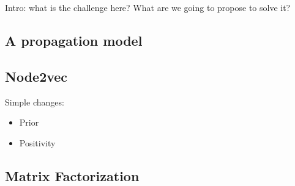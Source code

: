 Intro: what is the challenge here? What are we going to propose to solve it?

\subsection{A propagation model}

\subsection{Node2vec}

Simple changes:

\begin{itemize}
  \item Prior
  \item Positivity
\end{itemize}

\subsection{Matrix Factorization}
